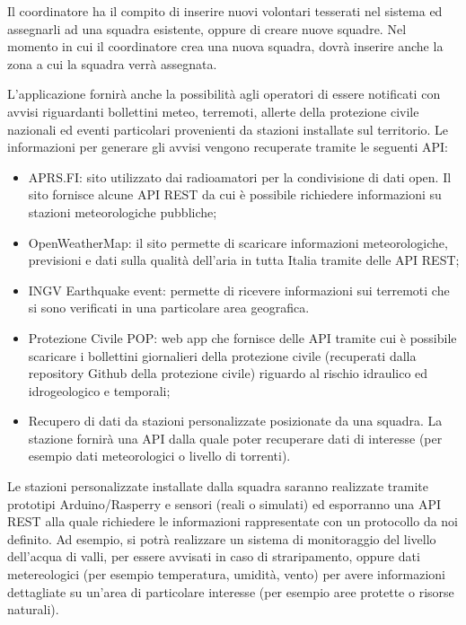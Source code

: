 Il coordinatore ha il compito di inserire nuovi volontari tesserati nel sistema ed assegnarli ad una squadra esistente, oppure di creare nuove squadre. Nel momento in cui il coordinatore crea una nuova squadra, dovrà inserire anche la zona a cui la squadra verrà assegnata.

L’applicazione fornirà anche la possibilità agli operatori di essere notificati con avvisi riguardanti bollettini meteo, terremoti, allerte della protezione civile nazionali ed eventi particolari provenienti da stazioni installate sul territorio. Le informazioni per generare gli avvisi vengono recuperate tramite le seguenti API: 
\begin{itemize}
	\item APRS.FI: sito utilizzato dai radioamatori per la condivisione di dati open. Il sito fornisce alcune API REST da cui è possibile richiedere informazioni su stazioni meteorologiche pubbliche;
	\item OpenWeatherMap: il sito permette di scaricare informazioni meteorologiche, previsioni e dati sulla qualità dell’aria in tutta Italia tramite delle API REST;
	\item INGV Earthquake event: permette di ricevere informazioni sui terremoti che si sono verificati in una particolare area geografica.
	\item Protezione Civile POP: web app che fornisce delle API tramite cui è possibile scaricare i bollettini giornalieri della protezione civile (recuperati dalla repository Github della protezione civile) riguardo al rischio idraulico ed idrogeologico e temporali;
	\item Recupero di dati da stazioni personalizzate posizionate da una squadra. La stazione fornirà una API dalla quale poter recuperare dati di interesse (per esempio dati meteorologici o livello di torrenti). 
\end{itemize}

Le stazioni personalizzate installate dalla squadra saranno realizzate tramite prototipi Arduino/Rasperry e sensori (reali o simulati) ed esporranno una API REST alla quale richiedere le informazioni rappresentate con un protocollo da noi definito. Ad esempio, si potrà realizzare un sistema di monitoraggio del livello dell’acqua di valli, per essere avvisati in caso di straripamento, oppure dati metereologici (per esempio temperatura, umidità, vento) per avere informazioni dettagliate su un’area di particolare interesse (per esempio aree protette o risorse naturali). 

